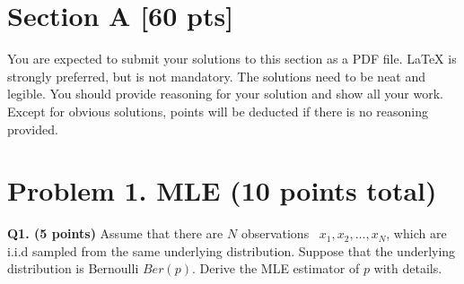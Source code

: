 \documentclass[11pt]{article}
\begin{document}
\section*{Section A [60 pts]}

You are expected to submit your solutions to this section as a PDF file. LaTeX is strongly preferred, but is not mandatory. The solutions need to be neat and legible. You should provide reasoning for your solution and show all your work. Except for obvious solutions, points will be deducted if there is no reasoning provided.

\section*{Problem 1. MLE (10 points total)}


\textbf{Q1. (5 points)} Assume that there are $N$ observations ~$x_1, x_2, \ldots , x_N$, which are i.i.d sampled from the same underlying distribution. Suppose that the underlying distribution is Bernoulli $Ber(p)$. Derive the MLE estimator of $p$ with details.

    
\end{document}
